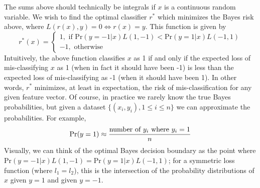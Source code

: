 \documentclass{article}
\begin{document}
The sums above should technically be integrals if $ x $ is a continuous random variable. We wish to find the optimal classifier $ r^* $ which minimizes the Bayes risk above, where $ L(r(x), y) = 0 \iff r(x) = y $. This function is given by
$$ r^*(x) = \begin{cases}
	1, \text{ if } \text{Pr}(y = -1 | x) L(1, -1) < \text{Pr}(y = 1 | x) L(-1, 1) \\
	-1, \text{ otherwise }
\end{cases} $$
Intuitively, the above function classifies $ x $ as 1 if and only if the expected loss of mis-classifying $ x $ as 1 (when in fact it should have been -1) is less than the expected loss of mis-classifying as -1 (when it should have been 1). In other words, $ r^* $ minimizes, at least in expectation, the risk of mis-classification for any given feature vector. Of course, in practice we rarely know the true Bayes probabilities, but given a dataset $ \{ (x_i, y_i), 1 \leq i \leq n \} $ we can approximate the probabilities. For example,
$$ \text{Pr}(y = 1) \approx \frac{\text{number of $ y_i $ where $ y_i = 1 $}}{n} $$
Visually, we can think of the optimal Bayes decision boundary as the point where $ \text{Pr}(y = -1 | x) L(1, -1) = \text{Pr}(y = 1 | x) L(-1, 1) $; for a symmetric loss function (where $ l_1 = l_2 $), this is the intersection of the probability distributions of $ x $ given $ y = 1 $ and given $ y = -1 $.
\end{document}
